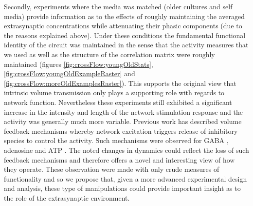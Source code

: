 Secondly, experiments where the media was matched (older cultures and self media) provide information as to the effects of roughly maintaining the averaged extrasynaptic concentrations while attenuating their phasic components (due to the reasons explained above). Under these conditions the fundamental functional identity of the circuit was maintained in the sense that the activity measures that we used as well as the structure of the correlation matrix were roughly maintained (figures \ref{fig:crossFlow:youngOldStats}, \ref{fig:crossFlow:youngOldExampleRaster} and \ref{fig:crossFlow:moreOldExamplesRaster}). This supports the original view that intrinsic volume transmission only plays a supporting role with regards to network function. Nevertheless these experiments still exhibited a significant increase in the intensity and length of the network stimulation response and the activity was generally much more variable. Previous work has described volume feedback mechanisms whereby network excitation triggers release of inhibitory species to control the activity. Such mechanisms were observed for GABA \cite{tamas2003identified}, adenosine \cite{wall2015localized} and ATP \cite{zhang2003atp}. The noted changes in dynamics could reflect the loss of such feedback mechanisms and therefore offers a novel and interesting view of how they operate. These observation were made with only crude measures of functionality and so we propose that, given a more advanced experimental design and analysis, these type of manipulations could provide important insight as to the role of the extrasynaptic environment.


